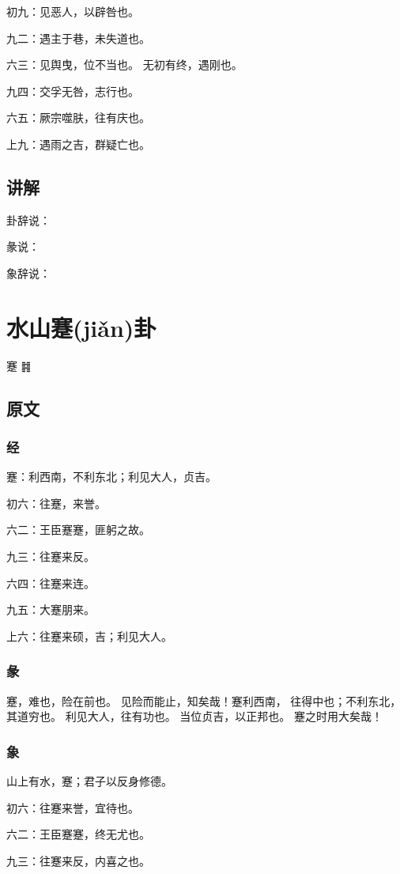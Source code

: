 \documentclass[12pt,oneside]{book}
\begin{document}
初九：见恶人，以辟咎也。

九二：遇主于巷，未失道也。

六三：见舆曳，位不当也。 无初有终，遇刚也。

九四：交孚无咎，志行也。

六五：厥宗噬肤，往有庆也。

上九：遇雨之吉，群疑亡也。

\section{讲解}
卦辞说：

彖说：

象辞说：


\chapter{水山蹇(jiǎn)卦}
蹇 {\Large ䷦}

\section{原文}

\subsection{经}
蹇：利西南，不利东北；利见大人，贞吉。

初六：往蹇，来誉。

六二：王臣蹇蹇，匪躬之故。

九三：往蹇来反。

六四：往蹇来连。

九五：大蹇朋来。

上六：往蹇来硕，吉；利见大人。

\subsection{彖}
蹇，难也，险在前也。 见险而能止，知矣哉！蹇利西南， 往得中也；不利东北，其道穷也。 利见大人，往有功也。 当位贞吉，以正邦也。 蹇之时用大矣哉！

\subsection{象}
山上有水，蹇；君子以反身修德。

初六：往蹇来誉，宜待也。

六二：王臣蹇蹇，终无尤也。

九三：往蹇来反，内喜之也。
\end{document}
